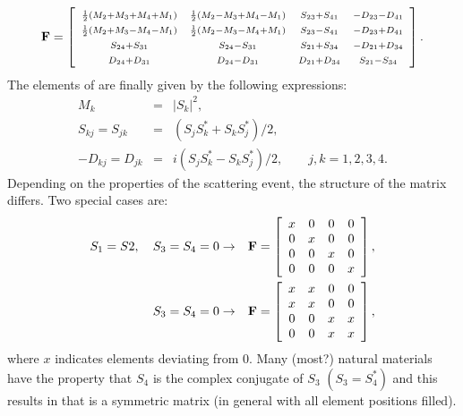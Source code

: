 \begin{equation}
  \label{eq:polarisation:Fmatrix}
  \mathbf{F} = \left[ \begin{array}{cccc} 
    \scriptstyle \frac{1}{2}(M_2+M_3+M_4+M_1) & 
    \scriptstyle \frac{1}{2}(M_2-M_3+M_4-M_1) & 
    \scriptstyle S_{23}+S_{41} & \scriptstyle -D_{23}-D_{41} \\
    \scriptstyle \frac{1}{2}(M_2+M_3-M_4-M_1) & 
    \scriptstyle \frac{1}{2}(M_2-M_3-M_4+M_1) & 
    \scriptstyle S_{23}-S_{41} & \scriptstyle -D_{23}+D_{41} \\
    \scriptstyle S_{24}+S_{31} & \scriptstyle S_{24}-S_{31} & 
    \scriptstyle S_{21}+S_{34} & \scriptstyle -D_{21}+D_{34} \\
    \scriptstyle D_{24}+D_{31} & \scriptstyle D_{24}-D_{31} & 
    \scriptstyle D_{21}+D_{34} & \scriptstyle S_{21}-S_{34} 
  \end{array} \right].
\end{equation}
The elements of  are finally given by the following
expressions:
\begin{eqnarray}
  M_k &=& |S_k|^2, \\
  S_{kj} = S_{jk} &=& (S_jS_k^\ast+S_kS_j^\ast)/2, \\
  -D_{kj} = D_{jk} &=& i(S_jS_k^\ast-S_kS_j^\ast)/2, \qquad j,k= 1, 2, 3, 4.
\end{eqnarray}
Depending on the properties of the scattering event, the structure of
the matrix  differs. Two special cases are:
\begin{eqnarray}
  \label{eq:Fcase1}
  S_1=S2,\quad S_3=S_4=0 &\to&    \mathbf{F} =
      \left[\begin{array}{cccc}
        x&0&0&0\\
        0&x&0&0\\
        0&0&x&0\\
        0&0&0&x
      \end{array}
      \right], \\
  \label{eq:Fcase2}
  S_3=S_4=0 &\to&    \mathbf{F} =
      \left[\begin{array}{cccc}
        x&x&0&0\\
        x&x&0&0\\
        0&0&x&x\\
        0&0&x&x
      \end{array}
      \right],
\end{eqnarray}
where $x$ indicates elements deviating from 0. Many (most?)  natural
materials have the property that $S_4$ is the complex conjugate of
$S_3$ $(S_3=S_4^\ast)$ and this results in that  is a
symmetric matrix (in general with all element positions filled).



